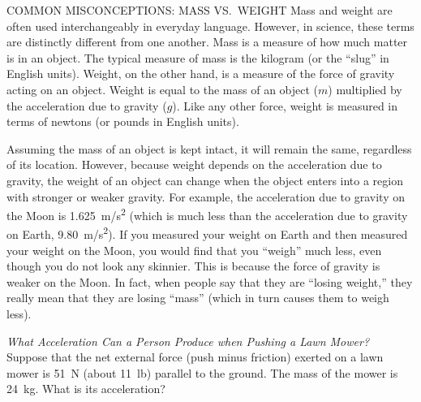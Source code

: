 \documentclass[../../main-ap-physics.tex]{subfiles}
\begin{document}
\begin{gradient}{COMMON MISCONCEPTIONS: MASS VS.~WEIGHT}
    Mass and weight are often used interchangeably in everyday language. However, in science, these terms are distinctly different from one another. Mass is a measure of how much matter is in an object. The typical measure of mass is the kilogram (or the ``slug'' in English units). Weight, on the other hand, is a measure of the force of gravity acting on an object. Weight is equal to the mass of an object ($m$) multiplied by the acceleration due to gravity ($g$). Like any other force, weight is measured in terms of newtons (or pounds in English units).

    \vspace{1em}

    Assuming the mass of an object is kept intact, it will remain the same, regardless of its location. However, because weight depends on the acceleration due to gravity, the weight of an object can change when the object enters into a region with stronger or weaker gravity. For example, the acceleration due to gravity on the Moon is \SI{1.625}{m/s^2} (which is much less than the acceleration due to gravity on Earth, \SI{9.80}{m/s^2}). If you measured your weight on Earth and then measured your weight on the Moon, you would find that you ``weigh'' much less, even though you do not look any skinnier. This is because the force of gravity is weaker on the Moon. In fact, when people say that they are ``losing weight,'' they really mean that they are losing ``mass'' (which in turn causes them to weigh less).
\end{gradient}


\begin{example}
    \textit{What Acceleration Can a Person Produce when Pushing a Lawn Mower?}\\
    Suppose that the net external force (push minus friction) exerted on a lawn mower is \SI{51}{N} (about \SI{11}{lb}) parallel to the ground. The mass of the mower is \SI{24}{kg}. What is its acceleration?
\end{example}

\begin{center}
    \captionsetup{type=figure,margin=1in,font=scriptsize}
\end{center}
\end{document}
